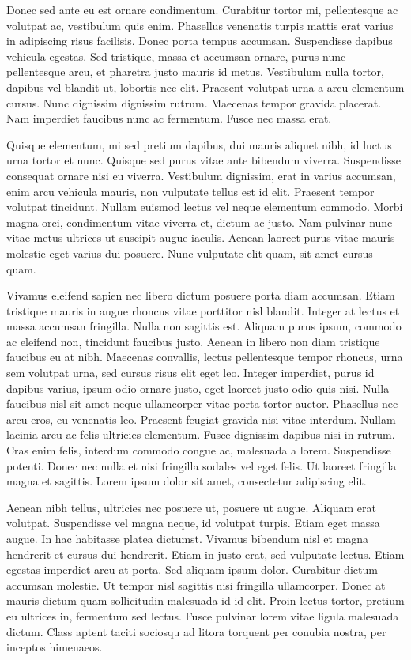 Donec sed ante eu est ornare condimentum.
Curabitur tortor mi, pellentesque ac volutpat ac, vestibulum quis enim.
Phasellus venenatis turpis mattis erat varius in adipiscing risus facilisis.
Donec porta tempus accumsan.
Suspendisse dapibus vehicula egestas.
Sed tristique, massa et accumsan ornare, purus nunc pellentesque arcu, et pharetra justo mauris id metus.
Vestibulum nulla tortor, dapibus vel blandit ut, lobortis nec elit.
Praesent volutpat urna a arcu elementum cursus.
Nunc dignissim dignissim rutrum.
Maecenas tempor gravida placerat.
Nam imperdiet faucibus nunc ac fermentum.
Fusce nec massa erat.

Quisque elementum, mi sed pretium dapibus, dui mauris aliquet nibh, id luctus urna tortor et nunc.
Quisque sed purus vitae ante bibendum viverra.
Suspendisse consequat ornare nisi eu viverra.
Vestibulum dignissim, erat in varius accumsan, enim arcu vehicula mauris, non vulputate tellus est id elit.
Praesent tempor volutpat tincidunt.
Nullam euismod lectus vel neque elementum commodo.
Morbi magna orci, condimentum vitae viverra et, dictum ac justo.
Nam pulvinar nunc vitae metus ultrices ut suscipit augue iaculis.
Aenean laoreet purus vitae mauris molestie eget varius dui posuere.
Nunc vulputate elit quam, sit amet cursus quam.

Vivamus eleifend sapien nec libero dictum posuere porta diam accumsan.
Etiam tristique mauris in augue rhoncus vitae porttitor nisl blandit.
Integer at lectus et massa accumsan fringilla.
Nulla non sagittis est.
Aliquam purus ipsum, commodo ac eleifend non, tincidunt faucibus justo.
Aenean in libero non diam tristique faucibus eu at nibh.
Maecenas convallis, lectus pellentesque tempor rhoncus, urna sem volutpat urna, sed cursus risus elit eget leo.
Integer imperdiet, purus id dapibus varius, ipsum odio ornare justo, eget laoreet justo odio quis nisi.
Nulla faucibus nisl sit amet neque ullamcorper vitae porta tortor auctor.
Phasellus nec arcu eros, eu venenatis leo.
Praesent feugiat gravida nisi vitae interdum.
Nullam lacinia arcu ac felis ultricies elementum.
Fusce dignissim dapibus nisi in rutrum.
Cras enim felis, interdum commodo congue ac, malesuada a lorem.
Suspendisse potenti.
Donec nec nulla et nisi fringilla sodales vel eget felis.
Ut laoreet fringilla magna et sagittis.
Lorem ipsum dolor sit amet, consectetur adipiscing elit.

Aenean nibh tellus, ultricies nec posuere ut, posuere ut augue.
Aliquam erat volutpat.
Suspendisse vel magna neque, id volutpat turpis.
Etiam eget massa augue.
In hac habitasse platea dictumst.
Vivamus bibendum nisl et magna hendrerit et cursus dui hendrerit.
Etiam in justo erat, sed vulputate lectus.
Etiam egestas imperdiet arcu at porta.
Sed aliquam ipsum dolor.
Curabitur dictum accumsan molestie.
Ut tempor nisl sagittis nisi fringilla ullamcorper.
Donec at mauris dictum quam sollicitudin malesuada id id elit.
Proin lectus tortor, pretium eu ultrices in, fermentum sed lectus.
Fusce pulvinar lorem vitae ligula malesuada dictum.
Class aptent taciti sociosqu ad litora torquent per conubia nostra, per inceptos himenaeos.


